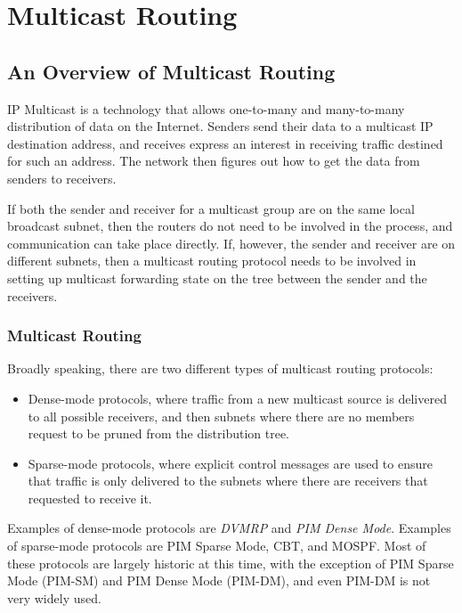 %
%

\chapter{Multicast Routing}
\label{multicast}
\section{An Overview of Multicast Routing}

IP Multicast is a technology that allows one-to-many and many-to-many
distribution of data on the Internet.  Senders send their data to a
multicast IP destination address, and receives express an interest in
receiving traffic destined for such an address.  The network then
figures out how to get the data from senders to receivers.  

If both the sender and receiver for a multicast group are on the same
local broadcast subnet, then the routers do not need to be involved in
the process, and communication can take place directly.  If, however,
the sender and receiver are on different subnets, then a multicast
routing protocol needs to be involved in setting up multicast
forwarding state on the tree between the sender and the receivers.

\subsection{Multicast Routing}

Broadly speaking, there are two different types of multicast routing
protocols:
\begin{itemize}
\item Dense-mode protocols, where traffic from a new multicast source
  is delivered to all possible receivers, and then subnets where there
  are no members request to be pruned from the distribution tree.
\item Sparse-mode protocols, where explicit control messages are used
  to ensure that traffic is only delivered to the subnets where there
  are receivers that requested to receive it.
\end{itemize}
Examples of dense-mode protocols are {\it DVMRP} and {\it PIM Dense
Mode}.  Examples of sparse-mode protocols are PIM Sparse Mode, CBT,
and MOSPF.  Most of these protocols are largely historic at this time,
with the exception of PIM Sparse Mode (PIM-SM) and PIM Dense Mode
(PIM-DM), and even PIM-DM is not very widely used.

